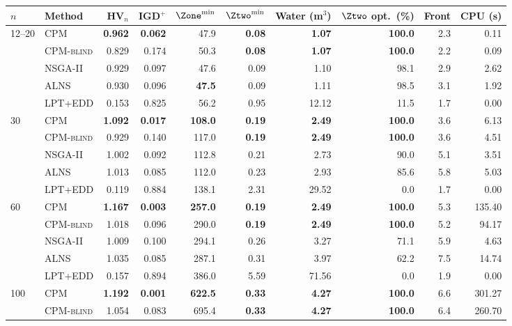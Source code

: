 \begin{tabular}{@{}llrrrrrrrr@{}}
\toprule
$n$ & Method & HV$_n$ & IGD$^+$ & $\Zone^{\min}$ & $\Ztwo^{\min}$ &
Water (m$^3$) & $\Ztwo$ opt.\ (\%) & Front & CPU (s) \\
\midrule
\multirow{5}{*}{12--20} & \textsc{CPM} & \textbf{0.962} & \textbf{0.062} & 47.9 & \textbf{0.08} & \textbf{1.07} & \textbf{100.0} & 2.3 & 0.11 \\
 & \textsc{CPM-blind} & 0.829 & 0.174 & 50.3 & \textbf{0.08} & \textbf{1.07} & \textbf{100.0} & 2.2 & 0.09 \\
 & \textsc{NSGA-II} & 0.929 & 0.097 & 47.6 & 0.09 & 1.10 & 98.1 & 2.9 & 2.62 \\
 & \textsc{ALNS} & 0.930 & 0.096 & \textbf{47.5} & 0.09 & 1.11 & 98.5 & 3.1 & 1.92 \\
 & \textsc{LPT+EDD} & 0.153 & 0.825 & 56.2 & 0.95 & 12.12 & 11.5 & 1.7 & 0.00 \\
\midrule
\multirow{5}{*}{30} & \textsc{CPM} & \textbf{1.092} & \textbf{0.017} & \textbf{108.0} & \textbf{0.19} & \textbf{2.49} & \textbf{100.0} & 3.6 & 6.13 \\
 & \textsc{CPM-blind} & 0.929 & 0.140 & 117.0 & \textbf{0.19} & \textbf{2.49} & \textbf{100.0} & 3.6 & 4.51 \\
 & \textsc{NSGA-II} & 1.002 & 0.092 & 112.8 & 0.21 & 2.73 & 90.0 & 5.1 & 3.51 \\
 & \textsc{ALNS} & 1.013 & 0.085 & 112.0 & 0.23 & 2.93 & 85.6 & 5.8 & 5.03 \\
 & \textsc{LPT+EDD} & 0.119 & 0.884 & 138.1 & 2.31 & 29.52 & 0.0 & 1.7 & 0.00 \\
\midrule
\multirow{5}{*}{60} & \textsc{CPM} & \textbf{1.167} & \textbf{0.003} & \textbf{257.0} & \textbf{0.19} & \textbf{2.49} & \textbf{100.0} & 5.3 & 135.40 \\
 & \textsc{CPM-blind} & 1.018 & 0.096 & 290.0 & \textbf{0.19} & \textbf{2.49} & \textbf{100.0} & 5.2 & 94.17 \\
 & \textsc{NSGA-II} & 1.009 & 0.100 & 294.1 & 0.26 & 3.27 & 71.1 & 5.9 & 4.63 \\
 & \textsc{ALNS} & 1.035 & 0.085 & 287.1 & 0.31 & 3.97 & 62.2 & 7.5 & 14.74 \\
 & \textsc{LPT+EDD} & 0.157 & 0.894 & 386.0 & 5.59 & 71.56 & 0.0 & 1.9 & 0.00 \\
\midrule
\multirow{5}{*}{100} & \textsc{CPM} & \textbf{1.192} & \textbf{0.001} & \textbf{622.5} & \textbf{0.33} & \textbf{4.27} & \textbf{100.0} & 6.6 & 301.27 \\
 & \textsc{CPM-blind} & 1.054 & 0.083 & 695.4 & \textbf{0.33} & \textbf{4.27} & \textbf{100.0} & 6.4 & 260.70 \\

\end{tabular}

